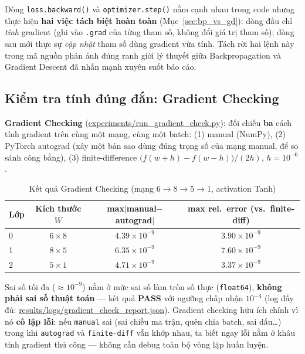 \documentclass[12pt,a4paper]{report}
\begin{document}
Dòng \texttt{loss.backward()} và \texttt{optimizer.step()} nằm cạnh nhau
trong code nhưng thực hiện \textbf{hai việc tách biệt hoàn toàn}
(Mục~\ref{sec:bp_vs_gd}): dòng đầu chỉ \emph{tính} gradient (ghi vào
\texttt{.grad} của từng tham số, không đổi giá trị tham số); dòng sau mới
thực sự \emph{cập nhật} tham số dùng gradient vừa tính. Tách rời hai lệnh
này trong mã nguồn phản ánh đúng ranh giới lý thuyết giữa Backpropagation
và Gradient Descent đã nhấn mạnh xuyên suốt báo cáo.

\subsection{Kiểm tra tính đúng đắn: Gradient Checking}

\textbf{Gradient Checking} (\url{experiments/run_gradient_check.py}):
đối chiếu \textbf{ba} cách tính gradient trên cùng một mạng, cùng một
batch: (1) manual (NumPy), (2) PyTorch autograd (xây một bản sao dùng đúng
trọng số của mạng manual, để so sánh công bằng), (3) finite-difference
$\big(f(w+h)-f(w-h)\big)/(2h)$, $h=10^{-6}$.

\begin{table}[htbp]
\centering
\caption{Kết quả Gradient Checking (mạng $6\to8\to5\to1$, activation Tanh)}
\begin{tabular}{@{}lccc@{}}
\toprule
Lớp & Kích thước $W$ & max$|$manual$-$autograd$|$ & max rel.\ error (vs.\ finite-diff) \\
\midrule
0 & $6\times8$ & $4.39\times10^{-9}$ & $3.90\times10^{-9}$ \\
1 & $8\times5$ & $6.35\times10^{-9}$ & $7.60\times10^{-9}$ \\
2 & $5\times1$ & $4.71\times10^{-9}$ & $3.37\times10^{-9}$ \\
\bottomrule
\end{tabular}
\label{tab:gradcheck}
\end{table}
\label{sec:gradcheck}

Sai số tối đa ($\approx10^{-9}$) nằm ở mức sai số làm tròn số thực
(\texttt{float64}), \textbf{không phải sai số thuật toán} --- kết quả
\textbf{PASS} với ngưỡng chấp nhận $10^{-4}$ (log đầy đủ:
\url{results/logs/gradient_check_report.json}). Gradient checking hữu
ích chính vì nó \textbf{cô lập lỗi}: nếu \texttt{manual} sai (sai chiều ma
trận, quên chia batch, sai dấu\ldots) trong khi \texttt{autograd} và
\texttt{finite-diff} vẫn khớp nhau, ta biết ngay lỗi nằm ở khâu tính
gradient thủ công --- không cần debug toàn bộ vòng lặp huấn luyện.
\end{document}
